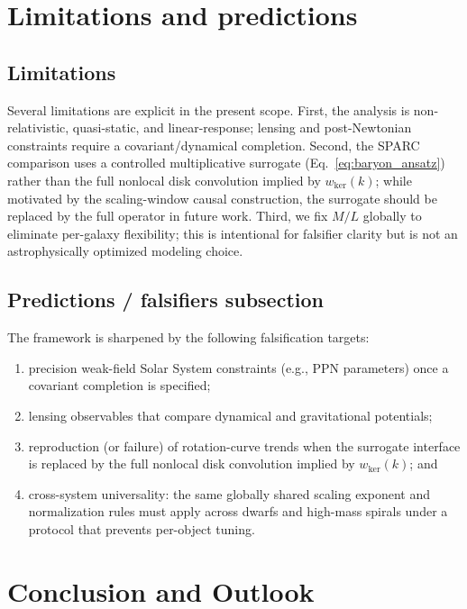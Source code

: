 \documentclass[entropy,article,submit,pdftex,moreauthors]{Definitions/mdpi}
\begin{document}
\section{Limitations and predictions}
\label{sec:limits}

\subsection{Limitations}

Several limitations are explicit in the present scope. First, the analysis is non-relativistic, quasi-static, and linear-response; lensing and post-Newtonian constraints require a covariant/dynamical completion. Second, the SPARC comparison uses a controlled multiplicative surrogate (Eq.~\ref{eq:baryon_ansatz}) rather than the full nonlocal disk convolution implied by $w_{\mathrm{ker}}(k)$; while motivated by the scaling-window causal construction, the surrogate should be replaced by the full operator in future work. Third, we fix $M/L$ globally to eliminate per-galaxy flexibility; this is intentional for falsifier clarity but is not an astrophysically optimized modeling choice.

\subsection{Predictions / falsifiers subsection}

The framework is sharpened by the following falsification targets:
\begin{enumerate}[label=(\roman*), itemsep=0pt, topsep=2pt]
    \item precision weak-field Solar System constraints (e.g., PPN parameters) once a covariant completion is specified;
    \item lensing observables that compare dynamical and gravitational potentials;
    \item reproduction (or failure) of rotation-curve trends when the surrogate interface is replaced by the full nonlocal disk convolution implied by $w_{\mathrm{ker}}(k)$; and
    \item cross-system universality: the same globally shared scaling exponent and normalization rules must apply across dwarfs and high-mass spirals under a protocol that prevents per-object tuning.
\end{enumerate}

\section{Conclusion and Outlook}
\label{sec:conclusion}
\end{document}
